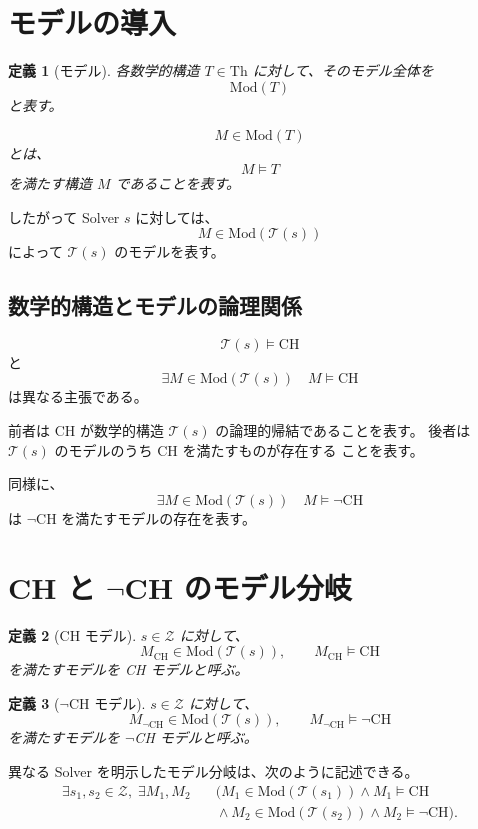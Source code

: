 \documentclass[a4paper,11pt]{article}
\newtheorem{definition}{定義}[section]
\newcommand{\Th}{\mathrm{Th}}
\newcommand{\Mod}{\mathrm{Mod}}
\begin{document}
\section{モデルの導入}

\begin{definition}[モデル]
各数学的構造 $T\in\Th$ に対して、そのモデル全体を
\[
\Mod(T)
\]
と表す。

\[
M\in\Mod(T)
\]
とは、
\[
M\models T
\]
を満たす構造 $M$ であることを表す。
\end{definition}

したがって Solver $s$ に対しては、
\[
M\in\Mod(\mathcal{T}(s))
\]
によって $\mathcal{T}(s)$ のモデルを表す。

\subsection{数学的構造とモデルの論理関係}

\[
\mathcal{T}(s)\models\mathrm{CH}
\]
と
\[
\exists M\in\Mod(\mathcal{T}(s))\quad
M\models\mathrm{CH}
\]
は異なる主張である。

前者は CH が数学的構造 $\mathcal{T}(s)$ の論理的帰結であることを表す。
後者は $\mathcal{T}(s)$ のモデルのうち CH を満たすものが存在する
ことを表す。

同様に、
\[
\exists M\in\Mod(\mathcal{T}(s))\quad
M\models\neg\mathrm{CH}
\]
は $\neg\mathrm{CH}$ を満たすモデルの存在を表す。

\section{CH と $\neg$CH のモデル分岐}

\begin{definition}[CH モデル]
$s\in\mathcal{Z}$ に対して、
\[
M_{\mathrm{CH}}\in\Mod(\mathcal{T}(s)),
\qquad
M_{\mathrm{CH}}\models\mathrm{CH}
\]
を満たすモデルを CH モデルと呼ぶ。
\end{definition}

\begin{definition}[$\neg$CH モデル]
$s\in\mathcal{Z}$ に対して、
\[
M_{\neg\mathrm{CH}}\in\Mod(\mathcal{T}(s)),
\qquad
M_{\neg\mathrm{CH}}\models\neg\mathrm{CH}
\]
を満たすモデルを $\neg$CH モデルと呼ぶ。
\end{definition}

異なる Solver を明示したモデル分岐は、次のように記述できる。
\[
\boxed{
\begin{aligned}
\exists s_1,s_2\in\mathcal{Z},\;
\exists M_1,M_2\quad
&
\bigl(
M_1\in\Mod(\mathcal{T}(s_1))
\land M_1\models\mathrm{CH}
\\
&{}\land
M_2\in\Mod(\mathcal{T}(s_2))
\land M_2\models\neg\mathrm{CH}
\bigr).
\end{aligned}}
\]
\end{document}
